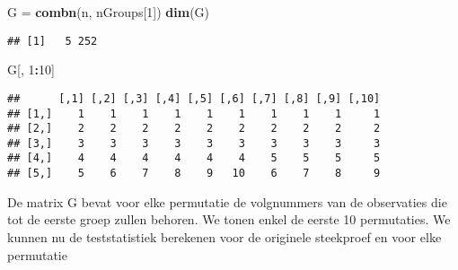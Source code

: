 \documentclass[12pt,dutch,coursenotes]{book}
\newenvironment{Shaded}{\begin{snugshade}}{\end{snugshade}}
\newcommand{\KeywordTok}[1]{\textcolor[rgb]{0.13,0.29,0.53}{\textbf{#1}}}
\newcommand{\DataTypeTok}[1]{\textcolor[rgb]{0.13,0.29,0.53}{#1}}
\newcommand{\DecValTok}[1]{\textcolor[rgb]{0.00,0.00,0.81}{#1}}
\newcommand{\StringTok}[1]{\textcolor[rgb]{0.31,0.60,0.02}{#1}}
\newcommand{\CommentTok}[1]{\textcolor[rgb]{0.56,0.35,0.01}{\textit{#1}}}
\newcommand{\ControlFlowTok}[1]{\textcolor[rgb]{0.13,0.29,0.53}{\textbf{#1}}}
\newcommand{\OperatorTok}[1]{\textcolor[rgb]{0.81,0.36,0.00}{\textbf{#1}}}
\newcommand{\NormalTok}[1]{#1}
\theoremstyle{definition}
\theoremstyle{definition}
\theoremstyle{definition}
\theoremstyle{remark}
\begin{document}
\begin{Shaded}
\begin{Highlighting}[]
\NormalTok{G =}\StringTok{ }\KeywordTok{combn}\NormalTok{(n, nGroups[}\DecValTok{1}\NormalTok{])}
\KeywordTok{dim}\NormalTok{(G)}
\end{Highlighting}
\end{Shaded}

\begin{verbatim}
## [1]   5 252
\end{verbatim}

\begin{Shaded}
\begin{Highlighting}[]
\NormalTok{G[, }\DecValTok{1}\OperatorTok{:}\DecValTok{10}\NormalTok{]}
\end{Highlighting}
\end{Shaded}

\begin{verbatim}
##      [,1] [,2] [,3] [,4] [,5] [,6] [,7] [,8] [,9] [,10]
## [1,]    1    1    1    1    1    1    1    1    1     1
## [2,]    2    2    2    2    2    2    2    2    2     2
## [3,]    3    3    3    3    3    3    3    3    3     3
## [4,]    4    4    4    4    4    4    5    5    5     5
## [5,]    5    6    7    8    9   10    6    7    8     9
\end{verbatim}

De matrix G bevat voor elke permutatie de volgnummers van de observaties
die tot de eerste groep zullen behoren. We tonen enkel de eerste 10
permutaties. We kunnen nu de teststatistiek berekenen voor de originele
steekproef en voor elke permutatie

\begin{Shaded}
\end{Shaded}
\end{document}
